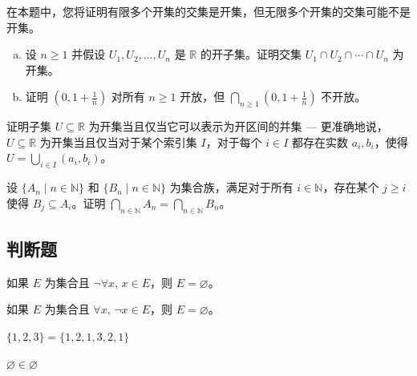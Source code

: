 \begin{chapex}
在本题中，您将证明有限多个开集的交集是开集，但无限多个开集的交集可能不是开集。
\begin{enumerate}[(a)]
\item 设 $n \ge 1$ 并假设 $U_1, U_2, \dots, U_n$ 是 $\mathbb{R}$ 的开子集。证明交集 $U_1 \cap U_2 \cap \cdots \cap U_n$ 为开集。
\item 证明 $(0,1+\frac{1}{n})$ 对所有 $n \ge 1$ 开放，但 $\bigcap_{n \ge 1} (0,1+\textstyle\frac{ 1}{n})$ 不开放。
\end{enumerate}
\end{chapex}

\begin{chapex}
\label{cqOpenSubsetsOfREnd}
证明子集 $U \subseteq \mathbb{R}$ 为开集当且仅当它可以表示为开区间的并集 --- 更准确地说，$U \subseteq \mathbb{R}$ 为开集当且仅当对于某个索引集 $I$，对于每个 $i \in I$ 都存在实数 $a_i, b_i$，使得 $U = \bigcup_{i \in I} (a_i, b_i)$。
\end{chapex}

\begin{chapex}
设 $\{ A_n \mid n \in \mathbb{N} \}$ 和 $\{ B_n \mid n \in \mathbb{N} \}$ 为集合族，满足对于所有 $i \in \mathbb{N}$，存在某个 $j \ge i$ 使得 $B_j \subseteq A_i$。证明 $\bigcap_{n \in \mathbb{N}} A_n = \bigcap_{n \in \mathbb{N}} B_n$。
\end{chapex}

\subsection*{判断题}


\begin{chapex}
\label{cqSetsTFBegin}
如果 $E$ 为集合且 $\neg \forall x,\, x \in E$，则 $E = \varnothing$。
\end{chapex}

\begin{chapex}
如果 $E$ 为集合且 $\forall x,\, \neg x \in E$，则 $E = \varnothing$。
\end{chapex}

\begin{chapex}
$\{ 1, 2, 3 \} = \{ 1, 2, 1, 3, 2, 1 \}$
\end{chapex}

\begin{chapex}
$\varnothing \in \varnothing$
\end{chapex}

